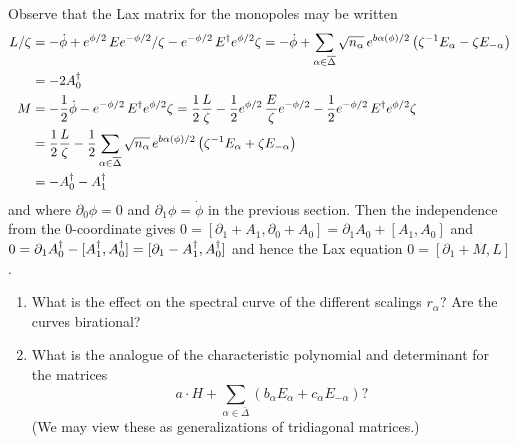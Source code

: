 \documentclass{article}
\begin{document}
Observe that the Lax matrix for the monopoles may be written 
\begin{align*}
L/\zeta&= -\dot\phi +e^{\phi/2}\,Ee^{-\phi/2}/\zeta-e^{-\phi/2}\,E\sp\dagger e^{\phi/2}\zeta
= -\dot\phi +
\sum_{\alpha\in\bar\Delta}\sqrt{n_\alpha}\, e^{b\alpha(\phi)/2} \left(
\zeta\sp{-1} E_\alpha - \zeta E_{-\alpha}
\right)\\
&=-2 A_0\sp\dagger\\
M&=-\frac12 \dot\phi -e^{-\phi/2}\,E\sp\dagger e^{\phi/2}\zeta
=\frac12 \frac{L}{\zeta} -\frac12 e^{\phi/2}\,\frac{E}{\zeta}e^{-\phi/2}-\frac12 e^{-\phi/2}\,E\sp\dagger e^{\phi/2}\zeta\\
&=\frac12 \frac{L}{\zeta} -\frac12 \sum_{\alpha\in\bar\Delta}\sqrt{n_\alpha}\, e^{b\alpha(\phi)/2} \left(
\zeta\sp{-1} E_\alpha + \zeta E_{-\alpha}
\right)\\
&=-A_0\sp\dagger - A_1\sp\dagger
\end{align*}
and where $\partial_0\phi=0$ and $\partial_1\phi=\dot\phi$ in the previous section. Then the independence
from the $0$-coordinate gives
$0=[\partial_1+A_1, \partial_0+A_0]= \partial_1 A_0 +[A_1, A_0]$ and
$0=\partial_1 A_0\sp\dagger -[A_1\sp\dagger, A_0\sp\dagger] = [\partial_1 -A_1\sp\dagger, A_0\sp\dagger] $
and hence the Lax equation $0=[\partial_1 +M,L]$.

\begin{enumerate}
	\item What is the effect on the spectral curve of the different scalings $r_\alpha$? Are the curves birational?
	\item What is the analogue of the characteristic polynomial and determinant for the matrices
	$$a\cdot H+\sum_{\alpha\in\bar\Delta} \left(b_\alpha E_\alpha+c_{\alpha}E_{-\alpha}\right)?$$
	(We may view these as generalizations of tridiagonal matrices.)
\end{enumerate}



\end{document}
